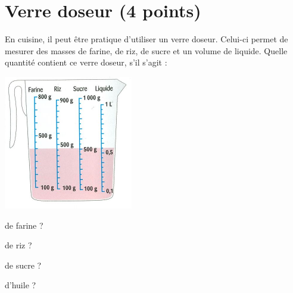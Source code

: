 \section{Verre doseur (4 points)}


En cuisine, il peut être pratique d'utiliser un verre doseur. Celui-ci permet de mesurer des masses de farine, de riz, de sucre et un volume de liquide.
Quelle quantité contient ce verre doseur, s'il s'agit :

\begin{center}
	\includegraphics[scale=1]{img/verre}
\end{center}
\begin{questions}
	
	\begin{multicols}{2}
		
	\question[1] 
	
	de farine ? 
	
	
	\question[1]
	
	de riz ?
	
	
	\question[1]
	
	de sucre ? 
	
	
	\question[1]
	
	d'huile ?
	\end{multicols}
	
\end{questions}